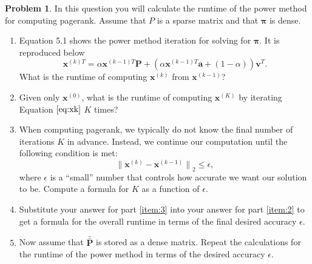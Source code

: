 \documentclass[10pt]{article}
\theoremstyle{definition}
\newtheorem{problem}{Problem}
\newcommand{\p}{\mathbf P}
\newcommand{\pb}{\bar {\p}}
\newcommand{\pbb}{\bar {\pb}}
\newcommand{\pr}{\bm \pi}
\newcommand{\x}{\mathbf x}
\newcommand{\ltwo}[1]{{\lVert {#1} \rVert}_2}
\begin{document}
\begin{problem}
    In this question you will calculate the runtime of the power method for computing pagerank.
    Assume that $P$ is a sparse matrix and that $\pr$ is dense.

    \begin{enumerate}
        \item
            Equation 5.1 shows the power method iteration for solving for $\pr$.
            It is reproduced below
            \begin{equation}
                \x^{(k)T}
                =
                \alpha \x^{(k-1)T} \p + (\alpha \x^{(k-1)T} \mathbf a + (1-\alpha)) \mathbf v^T
                .
                \label{eq:xk}
            \end{equation}
            What is the runtime of computing $\x^{(k)}$ from $\x^{(k-1)}$? %
            \vspace{4in}

        \item 
            \label{item:2}
            Given only $\x^{(0)}$, what is the runtime of computing $\x^{(K)}$ by iterating Equation $\eqref{eq:xk}$ $K$ times?
            \vspace{4in}

        \item
            \label{item:3}
            When computing pagerank,
            we typically do not know the final number of iterations $K$ in advance.
            Instead, we continue our computation until the following condition is met:
            \begin{equation}
                \ltwo { \x^{(k)} - \x^{(k-1)} } \le \epsilon,
            \end{equation}
            where $\epsilon$ is a ``small'' number that controls how accurate we want our solution to be.
            Compute a formula for $K$ as a function of $\epsilon$.
            \vspace{4in}

        \item
            Substitute your answer for part \ref{item:3} into your answer for part \ref{item:2} to get a formula for the overall runtime in terms of the final desired accuracy $\epsilon$.
            \vspace{4in}

        \item
            Now assume that $\pbb$ is stored as a dense matrix.
            Repeat the calculations for the runtime of the power method in terms of the desired accuracy $\epsilon$.
            \vspace{4in}


\end{enumerate}
\end{problem}
\end{document}
